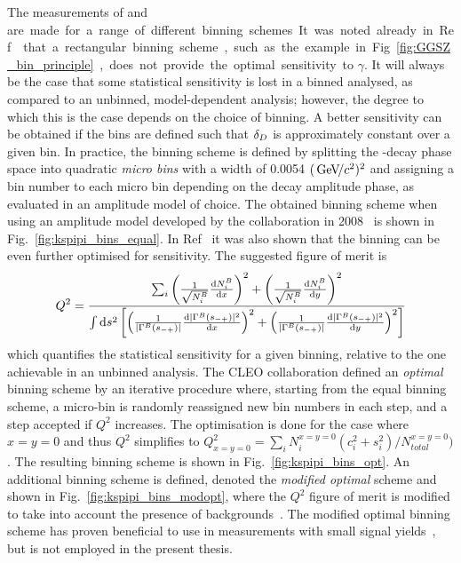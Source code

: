 The measurements of \ci and \si are made for a range of different binning schemes. It was noted already in Ref.~\cite{bondarUseQuantumcorrelatedD02008} that a rectangular binning scheme, such as the example in Fig.~\ref{fig:GGSZ_bin_principle}, does not provide the optimal sensitivity to $\gamma$. It will always be the case that some statistical sensitivity is lost in a binned analysed, as compared to an unbinned, model-dependent analysis; however, the degree to which this is the case depends on the choice of binning. A better sensitivity can be obtained if the bins are defined such that $\delta_{D}$ is approximately constant over a given bin. 
In practice, the binning scheme is defined by splitting the \D-decay phase space into quadratic \emph{micro bins} with a width of 0.0054 $(\text{\,Ge\kern -0.1em V\!/}c^2)^2$ and assigning a bin number to each micro bin depending on the decay amplitude phase, as evaluated in an amplitude model of choice. The obtained binning scheme when using an amplitude model developed by the \babar collaboration in 2008~\cite{BABAR2008} is shown in Fig.~\ref{fig:kspipi_bins_equal}. In Ref~\cite{bondarUseQuantumcorrelatedD02008} it was also shown that the binning can be even further optimised for sensitivity. The suggested figure of merit is
\begin{align}
    Q^2 = \frac
    {\sum_i \left(\frac{1}{\sqrt{N_i^{{B}}} }\frac{\text d N_i^{{B}}}{\text d x} \right)^2 + \left(\frac{1}{\sqrt{N_i^{{B}}}} \frac{\text d N_i ^{{B}}}{\text d y} \right)^2}
    {\int \text d s^2 \left[\left(\frac{1}{|\Gamma^{{B}}(s_{-+})|}\frac{ \text d |\Gamma^{{B}}(s_{-+})|^2 }{ \text d x}\right)^2 + \left(\frac{1}{|\Gamma^{{B}}(s_{-+})|}\frac{ \text d |\Gamma^{{B}}(s_{-+})|^2 }{ \text d y}\right)^2 \right]}
\end{align}
which quantifies the statistical sensitivity for a given binning, relative to the one achievable in an unbinned analysis. The CLEO collaboration defined an \emph{optimal} binning scheme by an iterative procedure where, starting from the equal binning scheme, a micro-bin is randomly reassigned new bin numbers in each step, and a step accepted if $Q^2$ increases. The optimisation is done for the case where $x=y=0$ and thus $Q^2$ simplifies to $Q^2_{x=y=0}=\sum_i N_i^{x=y=0}(c_i^2+s_i^2)/N_{total}^{x=y=0})$. The resulting binning scheme is shown in Fig.~\ref{fig:kspipi_bins_opt}. An additional binning scheme is defined, denoted the \emph{modified optimal} scheme and shown in Fig.~\ref{fig:kspipi_bins_modopt}, where the $Q^2$ figure of merit is modified to take into account the presence of backgrounds~\cite{CLEOCISI}. The modified optimal binning scheme has proven beneficial to use in measurements with small signal yields~\cite{LHCb-PAPER-2016-006}, but is not employed in the present thesis. 

